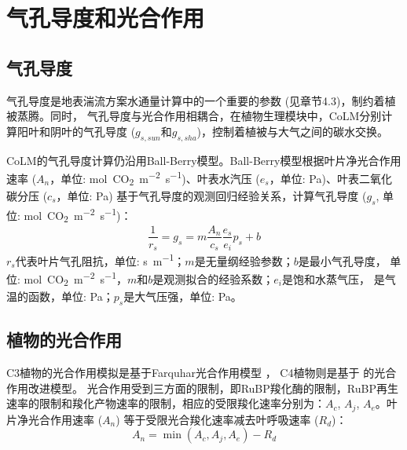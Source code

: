\chapter{气孔导度和光合作用}


\section{气孔导度}\label{气孔导度}
气孔导度是地表湍流方案水通量计算中的一个重要的参数 (见章节4.3)，制约着植被蒸腾。同时，
气孔导度与光合作用相耦合，在植物生理模块中，CoLM分别计算阳叶和阴叶的气孔导度 ($g_{s,sun}$和$g_{s,sha}$)，控制着植被与大气之间的碳水交换。


CoLM的气孔导度计算仍沿用Ball-Berry模型。Ball-Berry模型根据叶片净光合作用速率 
($A_n$，单位: \unit{mol.CO_2.m^{-2}.s^{-1}})、叶表水汽压 ($e_s$，单位: Pa)、叶表二氧化碳分压 ($c_s$，单位: Pa) 
基于气孔导度的观测回归经验关系，计算气孔导度 ($g_s$, 单位: \unit{mol.CO_2.m^{-2}.s^{-1}})： 
\begin{equation}\label{rs_a1}
\frac{1}{r_{s}}=g_{s}=m \frac{A_{n}}{c_{s}} \frac{e_{s}}{e_{i}} p_{s}+b
\end{equation}
$r_s$代表叶片气孔阻抗，单位: \unit{s.m^{-1}}；$m$是无量纲经验参数；$b$是最小气孔导度，
单位: \unit{mol.CO_2.m^{-2}.s^{-1}}，$m$和$b$是观测拟合的经验系数；$e_i$是饱和水蒸气压，
是气温的函数，单位: Pa；$p_s$是大气压强，单位: Pa。
\section{植物的光合作用}\label{植物的光合作用}
C3植物的光合作用模拟是基于Farquhar光合作用模型 \citep{farquhar1980biochemical} ，
C4植物则是基于\citet{collatz1992} 的光合作用改进模型。
光合作用受到三方面的限制，即RuBP羧化酶的限制，RuBP再生速率的限制和羧化产物速率的限制，相应的受限羧化速率分别为：$A_{c}$, $A_{j}$, $A_{e}$。叶片净光合作用速率 ($A_{n}$) 等于受限光合羧化速率减去叶呼吸速率 ($R_d$)：
\begin{equation}\label{An1}
A_{n}=\min \left(A_{c}, A_{j}, A_{e}\right)-R_{d}
\end{equation}



